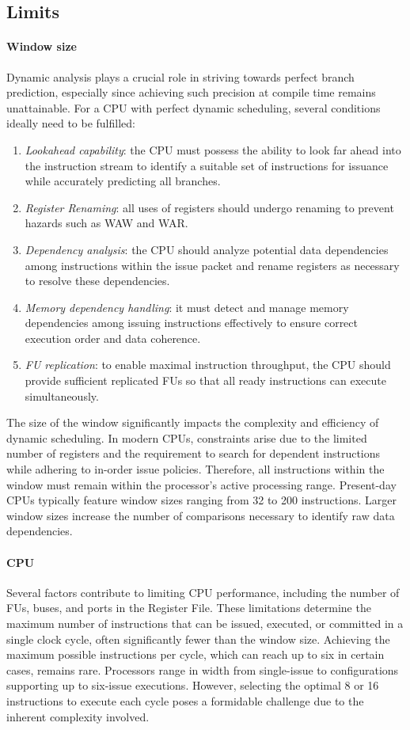 \subsection{Limits}
\paragraph*{Window size}
Dynamic analysis plays a crucial role in striving towards perfect branch prediction, especially since achieving such precision at compile time remains unattainable. 
For a CPU with perfect dynamic scheduling, several conditions ideally need to be fulfilled:
\begin{enumerate}
    \item \textit{Lookahead capability}: the CPU must possess the ability to look far ahead into the instruction stream to identify a suitable set of instructions for issuance while accurately predicting all branches.
    \item \textit{Register Renaming}: all uses of registers should undergo renaming to prevent hazards such as WAW and WAR.
    \item \textit{Dependency analysis}: the CPU should analyze potential data dependencies among instructions within the issue packet and rename registers as necessary to resolve these dependencies.
    \item \textit{Memory dependency handling}: it must detect and manage memory dependencies among issuing instructions effectively to ensure correct execution order and data coherence.
    \item \textit{FU replication}: to enable maximal instruction throughput, the CPU should provide sufficient replicated FUs so that all ready instructions can execute simultaneously.
\end{enumerate}
The size of the window significantly impacts the complexity and efficiency of dynamic scheduling.
In modern CPUs, constraints arise due to the limited number of registers and the requirement to search for dependent instructions while adhering to in-order issue policies. 
Therefore, all instructions within the window must remain within the processor's active processing range.
Present-day CPUs typically feature window sizes ranging from 32 to 200 instructions. 
Larger window sizes increase the number of comparisons necessary to identify raw data dependencies. 

\paragraph*{CPU}
Several factors contribute to limiting CPU performance, including the number of FUs, buses, and ports in the Register File. 
These limitations determine the maximum number of instructions that can be issued, executed, or committed in a single clock cycle, often significantly fewer than the window size. 
Achieving the maximum possible instructions per cycle, which can reach up to six in certain cases, remains rare.
Processors range in width from single-issue to configurations supporting up to six-issue executions. 
However, selecting the optimal 8 or 16 instructions to execute each cycle poses a formidable challenge due to the inherent complexity involved.

